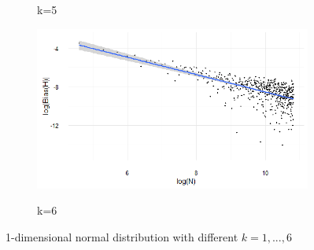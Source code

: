 \documentclass[12pt]{report}
\begin{document}
\begin{figure}
{\begin{subfigure}[b]{.6\textwidth}
\caption{k=5}
\end{subfigure}%
\begin{subfigure}[b]{.6\textwidth}
\centering
\includegraphics[width=\textwidth]{./Graphs/Best/Normal_k=6.png}\label{normal_k=6}
\caption{k=6}
\end{subfigure}%
}
\caption{1-dimensional normal distribution with different $k = 1, ..., 6$} \label{normal_graphs16}
\end{figure}
\end{document}
